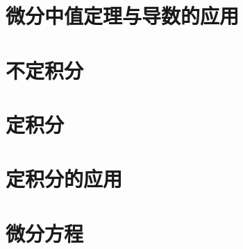 \documentclass[lang=cn,10pt]{elegantbook}
\begin{document}
\chapter{微分中值定理与导数的应用}



\chapter{不定积分}


\chapter{定积分}




\chapter{定积分的应用}



\chapter{微分方程}
\end{document}
